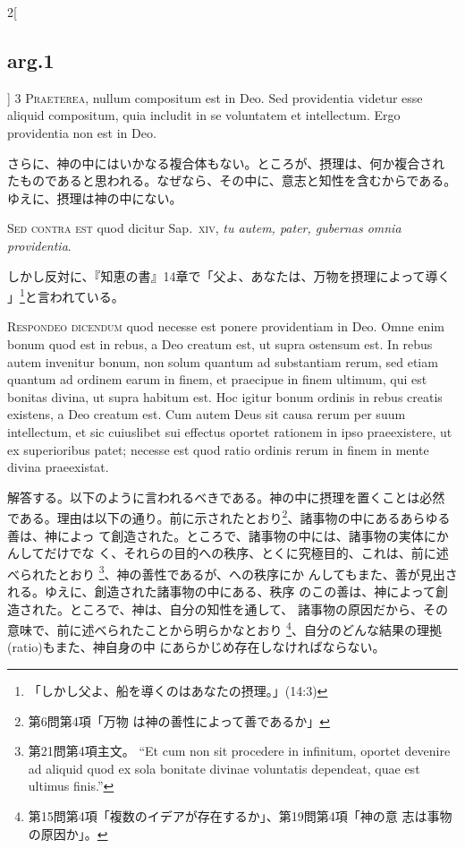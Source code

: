\documentclass[paper=a4paper,fontsize=10pt,jafontsize=9pt,titlepage]{jlreq}
\begin{document}
\begin{paracol}{2}[\subsection{arg.1}]
{\scshape 3 Praeterea}, nullum compositum est in
Deo. Sed providentia videtur esse aliquid compositum, quia includit in
se voluntatem et intellectum. Ergo providentia non est in Deo.

\switchcolumn

さらに、神の中にはいかなる複合体もない。ところが、摂理は、何か複合され
たものであると思われる。なぜなら、その中に、意志と知性を含むからである。
ゆえに、摂理は神の中にない。

\switchcolumn*[\subsection{s.c.}]

{\scshape Sed contra est} quod dicitur Sap.~{\scshape xiv}, {\itshape tu
autem, pater, gubernas omnia providentia}.

\switchcolumn

しかし反対に、『知恵の書』14章で「父よ、あなたは、万物を摂理によって導く
 」\footnote{「しかし父よ、船を導くのはあなたの摂理。」(14:3)}と言われている。


{\scshape Respondeo dicendum} quod necesse est ponere
providentiam in Deo. Omne enim bonum quod est in rebus, a Deo creatum
est, ut supra ostensum est. In rebus autem invenitur bonum, non solum
quantum ad substantiam rerum, sed etiam quantum ad ordinem earum in
finem, et praecipue in finem ultimum, qui est bonitas divina, ut supra
habitum est. Hoc igitur bonum ordinis in rebus creatis existens, a Deo
creatum est. Cum autem Deus sit causa rerum per suum intellectum, et sic
cuiuslibet sui effectus oportet rationem in ipso praeexistere, ut ex
superioribus patet; necesse est quod ratio ordinis rerum in finem in
mente divina praeexistat.

\switchcolumn

解答する。以下のように言われるべきである。神の中に摂理を置くことは必然
である。理由は以下の通り。前に示されたとおり\footnote{第6問第4項「万物
は神の善性によって善であるか」}、諸事物の中にあるあらゆる善は、神によっ
て創造された。ところで、諸事物の中には、諸事物の実体にかんしてだけでな
く、それらの目的への秩序、とくに究極目的、これは、前に述べられたとおり
\footnote{第21問第4項主文。 ``Et cum non sit procedere in infinitum,
oportet devenire ad aliquid quod ex sola bonitate divinae voluntatis
dependeat, quae est ultimus finis.''}、神の善性であるが、への秩序にか
んしてもまた、善が見出される。ゆえに、創造された諸事物の中にある、秩序
のこの善は、神によって創造された。ところで、神は、自分の知性を通して、
諸事物の原因だから、その意味で、前に述べられたことから明らかなとおり
\footnote{第15問第4項「複数のイデアが存在するか」、第19問第4項「神の意
志は事物の原因か」。}、自分のどんな結果の理拠(ratio)もまた、神自身の中
にあらかじめ存在しなければならない。


\end{paracol}
\end{document}
